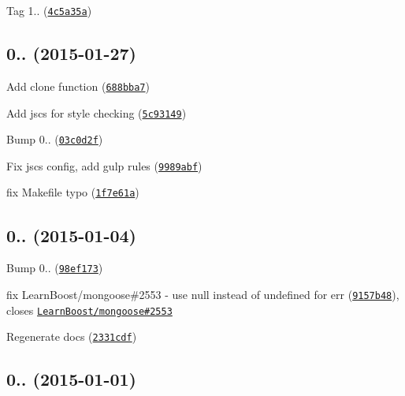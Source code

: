 \begin{DoxyItemize}
\item Tag 1.. (\href{https://github.com/vkarpov15/kareem/commit/4c5a35a}{\tt 4c5a35a})
\end{DoxyItemize}

\label{_0.0.8}%
 \subsection*{
\footnotesize 0.. (2015-\/01-\/27)
\normalsize }


\begin{DoxyItemize}
\item Add clone function (\href{https://github.com/vkarpov15/kareem/commit/688bba7}{\tt 688bba7})
\item Add jscs for style checking (\href{https://github.com/vkarpov15/kareem/commit/5c93149}{\tt 5c93149})
\item Bump 0.. (\href{https://github.com/vkarpov15/kareem/commit/03c0d2f}{\tt 03c0d2f})
\item Fix jscs config, add gulp rules (\href{https://github.com/vkarpov15/kareem/commit/9989abf}{\tt 9989abf})
\item fix Makefile typo (\href{https://github.com/vkarpov15/kareem/commit/1f7e61a}{\tt 1f7e61a})
\end{DoxyItemize}

\label{_0.0.7}%
 \subsection*{
\footnotesize 0.. (2015-\/01-\/04)
\normalsize }


\begin{DoxyItemize}
\item Bump 0.. (\href{https://github.com/vkarpov15/kareem/commit/98ef173}{\tt 98ef173})
\item fix Learn\+Boost/mongoose\#2553 -\/ use null instead of undefined for err (\href{https://github.com/vkarpov15/kareem/commit/9157b48}{\tt 9157b48}), closes \href{https://github.com/LearnBoost/mongoose/issues/2553}{\tt Learn\+Boost/mongoose\#2553}
\item Regenerate docs (\href{https://github.com/vkarpov15/kareem/commit/2331cdf}{\tt 2331cdf})
\end{DoxyItemize}

\label{_0.0.6}%
 \subsection*{
\footnotesize 0.. (2015-\/01-\/01)
\normalsize }


